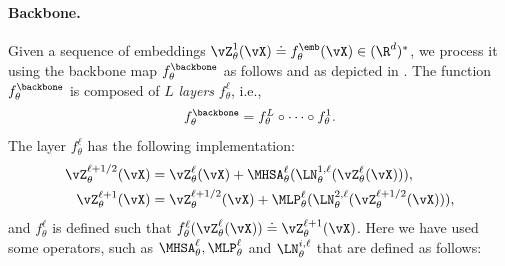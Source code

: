 \documentclass[../../book-main.tex]{subfiles}
\begin{document}
\paragraph{Backbone.} Given a sequence of embeddings
\(\vZ_{\theta}^{1}(\vX) \doteq f_{\theta}^{\emb}(\vX) \in
(\R^{d})^{*}\), we process it using the backbone map
\(f_{\theta}^{\backbone}\) as follows and as depicted in
.
The function
\(f_{\theta}^{\backbone}\) is composed of \(L\) \textit{layers}
\(f_{\theta}^{\ell}\), i.e.,
\begin{equation}
    f_{\theta}^{\backbone} = f_{\theta}^{L} \circ \cdots \circ f_{\theta}^{1} .
\end{equation}
The layer \(f_{\theta}^{\ell}\) has the following implementation:
\begin{align}\label{eq:vit-res-block}
    \vZ_{\theta}^{\ell + 1/2}(\vX)
    &= \vZ_{\theta}^{\ell}(\vX) +
    \MHSA_{\theta}^{\ell}(\LN_{\theta}^{1, \ell}(\vZ_{\theta}^{\ell}(\vX))) , \\
    \vZ_{\theta}^{\ell + 1}(\vX)
    &= \vZ_{\theta}^{\ell + 1/2}(\vX) +
    \MLP_{\theta}^{\ell}(\LN_{\theta}^{2, \ell}(\vZ_{\theta}^{\ell + 1/2}(\vX))) ,
\end{align}
and \(f_{\theta}^{\ell}\) is defined such that
\(f_{\theta}^{\ell}(\vZ_{\theta}^{\ell}(\vX)) \doteq
\vZ_{\theta}^{\ell + 1}(\vX)\).
Here we have used some operators,
such as \(\MHSA_{\theta}^{\ell}, \MLP_{\theta}^{\ell}\) and
\(\LN_{\theta}^{i, \ell}\) that are defined as follows:
\end{document}
